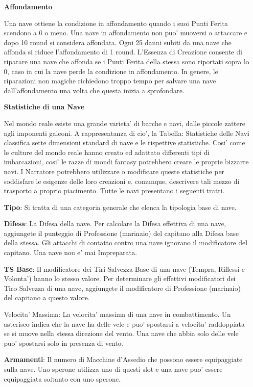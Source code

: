 \documentclass[a4paper,11pt,twoside,openany]{dndbook}
\begin{document}
{\textbf{Affondamento}

Una nave ottiene la condizione in affondamento quando i suoi Punti Ferita scendono a 0 o meno. Una nave in affondamento non puo' muoversi o attaccare e dopo 10 round si considera affondata. Ogni 25 danni subiti da una nave che affonda si riduce l'affondamento di 1 round. L’Essenza di Creazione consente di riparare una nave che affonda se i Punti Ferita della stessa sono riportati sopra lo 0, caso in cui la nave perde la condizione in affondamento. In genere, le riparazioni non magiche richiedono troppo tempo per salvare una nave dall'affondamento una volta che questa inizia a sprofondare.

\textbf{Statistiche di una Nave}

Nel mondo reale esiste una grande varieta' di barche e navi, dalle piccole zattere agli imponenti galeoni. A rappresentanza di cio', la Tabella: Statistiche delle Navi classifica sette dimensioni standard di nave e le rispettive statistiche. Cosi' come le culture del mondo reale hanno creato ed adattato differenti tipi di imbarcazioni, cosi' le razze di mondi fantasy potrebbero creare le proprie bizzarre navi.
I Narratore potrebbero utilizzare o modificare queste statistiche per soddisfare le esigenze delle loro creazioni e, comunque, descrivere tali mezzo di trasporto a proprio piacimento. Tutte le navi presentano i seguenti tratti.

\textbf{Tipo}: Si tratta di una categoria generale che elenca la tipologia base di nave.

\textbf{Difesa}: La Difesa della nave. Per calcolare la Difesa effettiva di una nave, aggiungete il punteggio di Professione (marinaio) del capitano alla Difesa base della stessa. Gli attacchi di contatto contro una nave ignorano il modificatore del capitano. Una nave non e' mai Impreparata.

\textbf{TS Base}: Il modificatore dei Tiri Salvezza Base di una nave (Tempra, Riflessi e Volonta') hanno lo stesso valore. Per determinare gli effettivi modificatori dei Tiro Salvezza di una nave, aggiungete il modificatore di Professione (marinaio) del capitano a questo valore.

Velocita' Massima: La velocita' massima di una nave in combattimento. Un asterisco indica che la nave ha delle vele e puo' spostarsi a velocita' raddoppiata se si muove nella stessa direzione del vento. Una nave che abbia solo delle vele puo' spostarsi solo in presenza di vento.

\textbf{Armamenti}: Il numero di Macchine d'Assedio che possono essere equipaggiate sulla nave. Uno sperone utilizza uno di questi slot e una nave puo' essere equipaggiata soltanto con uno sperone.

}
\end{document}
